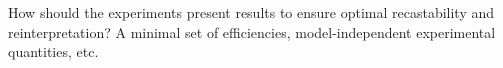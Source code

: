 How should the experiments present results to ensure optimal recastability and reinterpretation?  A minimal set of efficiencies, model-independent experimental quantities, etc.